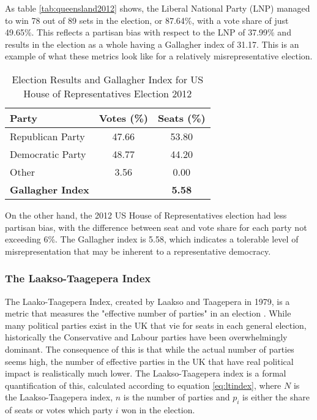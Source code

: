 \documentclass{article}
\begin{document}
As table \ref{tab:queensland2012} shows, the Liberal National Party (LNP) managed to win 78 out of 89 sets in the election, or 87.64\%, with a vote share of just 49.65\%. This reflects a partisan bias 
with respect to the LNP of 37.99\% and results in the election as a whole having a Gallagher index of 31.17. This is an example of what these metrics look like for a relatively misrepresentative election.

\begin{table}[H]
    \centering
    \begin{tabular}{|l|c|c|}
        \hline
        Party & Votes (\%) & Seats (\%) \\
        \hline
        Republican Party & 47.66 & 53.80 \\
        Democratic Party & 48.77 & 44.20 \\
        Other & 3.56 & 0.00 \\
        \hline
        \textbf{Gallagher Index} & & \textbf{5.58} \\
        \hline
    \end{tabular}
    \caption{Election Results and Gallagher Index for US House of Representatives Election 2012}
    \label{tab:gallagherindex}
\end{table}

On the other hand, the 2012 US House of Representatives election had less partisan bias, with the difference between seat and vote share for each party not exceeding 6\%. The Gallagher index
is 5.58, which indicates a tolerable level of misrepresentation that may be inherent to a representative democracy.

\subsubsection{The Laakso-Taagepera Index}

The Laako-Taagepera Index, created by Laakso and Taagepera in 1979, is a metric that measures the "effective number of parties" in an election \cite{ltindex}. While many political parties exist in the UK that
vie for seats in each general election, historically the Conservative and Labour parties have been overwhelmingly dominant. The consequence of this is that while the actual number of parties seems
high, the number of effective parties in the UK that have real political impact is realistically much lower. The Laakso-Taagepera index is a formal quantification of this, calculated according to
equation \ref{eq:ltindex}, where $N$ is the Laakso-Taagepera index, $n$ is the number of parties and $p_i$ is either the share of seats or votes which party $i$ won in the election.
\end{document}
